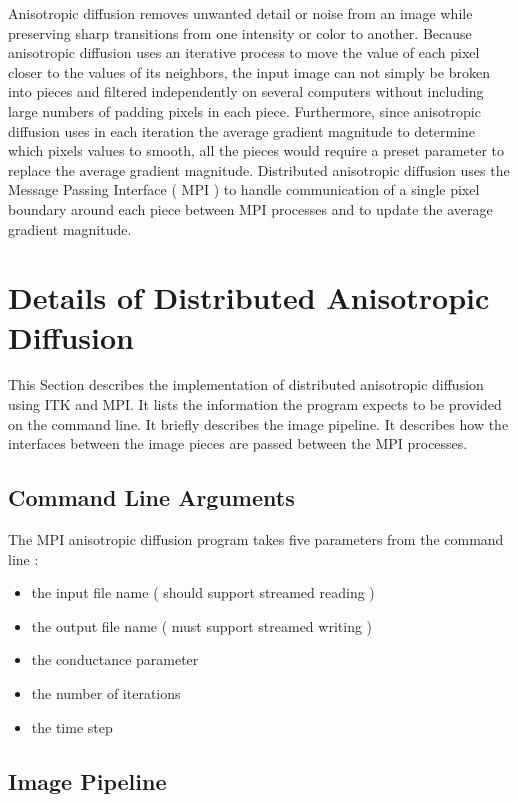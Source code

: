 \documentclass{InsightArticle}
\begin{document}
Anisotropic diffusion removes unwanted detail or noise 
from an image while preserving sharp transitions from one 
intensity or color to another. Because anisotropic 
diffusion uses an iterative process to move the value of 
each pixel closer to the values of its neighbors, the 
input image can not simply be broken into pieces and 
filtered independently on several computers without 
including large numbers of padding pixels in each piece. 
Furthermore, since anisotropic diffusion uses in each 
iteration the average gradient magnitude to determine 
which pixels values to smooth, all the pieces would 
require a preset parameter to replace the average 
gradient magnitude. Distributed anisotropic diffusion uses 
the Message Passing Interface ( MPI ) to handle communication 
of a single pixel boundary around each piece between MPI 
processes and to update the average gradient magnitude.

\section{Details of Distributed Anisotropic Diffusion}

This Section describes the implementation of distributed 
anisotropic diffusion using ITK and MPI. It lists the 
information the program expects to be provided on the 
command line. It briefly describes the image pipeline. It 
describes how the interfaces between the image pieces are 
passed between the MPI processes. 

\subsection{Command Line Arguments}

The MPI anisotropic diffusion program takes five 
parameters from the command line : 
\begin{itemize}
  \item  the input file name ( should support streamed reading )
  \item  the output file name ( must support streamed writing )
  \item  the conductance parameter
  \item  the number of iterations
  \item  the time step
\end{itemize}

\subsection{Image Pipeline}
\end{document}
